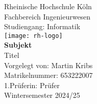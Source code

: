 \begin{titlepage}
    \centering
    
    {\huge Rheinische Hochschule Köln}\\[0.5cm]
    {\Large Fachbereich Ingenieurwesen}\\
    {\normalsize Studiengang: Informatik}\\[1cm]
    
    \texttt{[image: rh-logo]}\\[2cm]
    
    {\Large\textbf{Subjekt}}\\[1cm]
    
    {\Large Titel}\\[2cm]
    
    \normalsize
    Vorgelegt von: Martin Kribs \\
    Matrikelnummer: 653222007\\[2cm]
    
    1.Prüferin: Prüfer\\[0.3cm]
    
    Wintersemester 2024/25

    \vfill
    
\end{titlepage}
